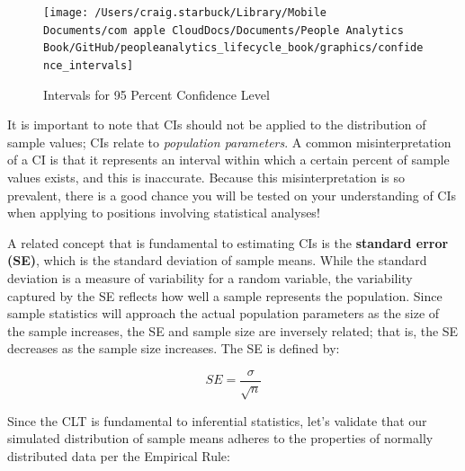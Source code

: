 \documentclass[]{book}
\newenvironment{Shaded}{\begin{snugshade}}{\end{snugshade}}
\newcommand{\CommentTok}[1]{\textcolor[rgb]{0.56,0.35,0.01}{\textit{#1}}}
\newcommand{\DecValTok}[1]{\textcolor[rgb]{0.00,0.00,0.81}{#1}}
\newcommand{\KeywordTok}[1]{\textcolor[rgb]{0.13,0.29,0.53}{\textbf{#1}}}
\newcommand{\NormalTok}[1]{#1}
\newcommand{\OperatorTok}[1]{\textcolor[rgb]{0.81,0.36,0.00}{\textbf{#1}}}
\newcommand{\StringTok}[1]{\textcolor[rgb]{0.31,0.60,0.02}{#1}}
\begin{document}
\begin{figure}

{\centering \texttt{[image: /Users/craig.starbuck/Library/Mobile Documents/com~apple~CloudDocs/Documents/People Analytics Book/GitHub/peopleanalytics\_lifecycle\_book/graphics/confidence\_intervals]} 

}

\caption{Intervals for 95 Percent Confidence Level}\label{fig:conf-int}
\end{figure}

It is important to note that CIs should not be applied to the distribution of sample values; CIs relate to \emph{population parameters}. A common misinterpretation of a CI is that it represents an interval within which a certain percent of sample values exists, and this is inaccurate. Because this misinterpretation is so prevalent, there is a good chance you will be tested on your understanding of CIs when applying to positions involving statistical analyses!

A related concept that is fundamental to estimating CIs is the \textbf{standard error (SE)}, which is the standard deviation of sample means. While the standard deviation is a measure of variability for a random variable, the variability captured by the SE reflects how well a sample represents the population. Since sample statistics will approach the actual population parameters as the size of the sample increases, the SE and sample size are inversely related; that is, the SE decreases as the sample size increases. The SE is defined by:

\[ SE = \frac{\sigma}{\sqrt{n}} \]

Since the CLT is fundamental to inferential statistics, let's validate that our simulated distribution of sample means adheres to the properties of normally distributed data per the Empirical Rule:

\begin{Shaded}
\end{Shaded}
\end{document}
